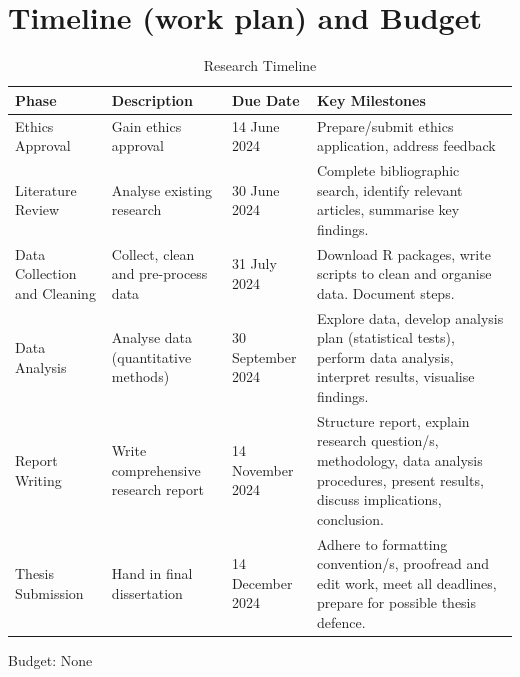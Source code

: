 \documentclass[12pt]{article}
\begin{document}
\section{Timeline (work plan) and Budget}

\begin{table}[hbt!]
    \centering
    \begin{tabular}{ |p{4cm}||p{4cm}|p{3.5cm}|p{4cm}|  }
    \hline    
    \textbf{Phase}  &\textbf{Description}  &\textbf{Due Date} &\textbf{Key Milestones}  \\
    \hline
    Ethics Approval   & Gain ethics approval &14 June 2024& Prepare/submit ethics application, address feedback \\
    \hline
    Literature Review   & Analyse existing research    &30 June 2024&   Complete bibliographic search, identify relevant articles, summarise key findings.\\
    \hline
    Data Collection and Cleaning& Collect, clean and pre-process data & 31 July 2024 & Download R packages, write scripts to clean and organise data. Document steps. \\
    \hline
    Data Analysis & Analyse data (quantitative methods) & 30 September 2024& Explore data, develop analysis plan (statistical tests), perform data analysis, interpret results, visualise findings.  \\
    \hline
    Report Writing    & Write comprehensive research report &14 November 2024 & Structure report, explain research question/s, methodology, data analysis procedures, present results, discuss implications, conclusion. \\
    \hline
    Thesis Submission    & Hand in final dissertation &14 December 2024 & Adhere to formatting convention/s, proofread and edit work, meet all deadlines, prepare for possible thesis defence. \\
    \hline
    \end{tabular}
    \caption{Research Timeline}
    \label{tab:my_label}
\end{table}

Budget: None


\end{document}
